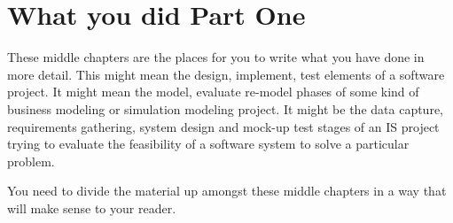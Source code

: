 %
%

\chapter{What you did Part One}

These middle chapters are the places for you to write what you have done in
more detail.  This might mean the design, implement, test elements of a
software project.   It might mean the model, evaluate re-model phases of some
kind of business modeling or simulation modeling project.  It might be the data
capture, requirements gathering, system design and mock-up test stages of an IS
project trying to evaluate the feasibility of a software system to solve a
particular problem.

You need to divide the material up amongst these middle chapters in a way that
will make sense to your reader.
